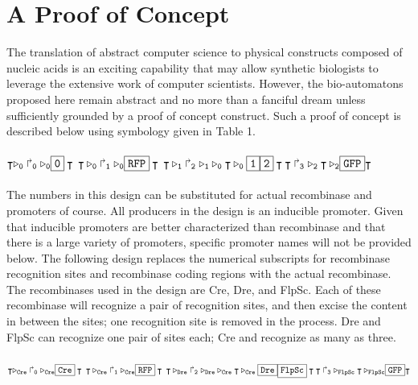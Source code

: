 \documentclass{article}
\newcommand{\prom}[1]{\Rsh_{\tt#1}}
\newcommand{\term}{\intercal}
\newcommand{\rrecsite}[1]{\triangleright_{\tt#1}}
\newcommand{\gene}[1]{\framebox{\tt #1}}
\begin{document}
\section{A Proof of Concept}
The translation of abstract computer science to physical constructs composed of nucleic acids is an exciting capability that may allow synthetic biologists to leverage the extensive work of computer scientists.  However, the bio-automatons proposed here remain abstract and no more than a fanciful dream unless sufficiently grounded by a proof of concept construct.  Such a proof of concept is described below using symbology given in Table 1.\\
 \\
$\term \rrecsite{0} \prom{0} \rrecsite{0} \gene{0} \term\\ 
\term \rrecsite{0} \prom{1} \rrecsite{0} \gene{RFP} \term\\
\term \rrecsite{1} \prom{2} \rrecsite{1} \rrecsite{0} \term \rrecsite{0} \gene{1} \gene{2} \term\\
\term \prom{3} \rrecsite{2} \term \rrecsite{2} \gene{GFP} \term$\\
 \\
The numbers in this design can be substituted for actual recombinase and promoters of course.  All producers in the design is an inducible promoter.  Given that inducible promoters are better characterized than recombinase and that there is a large variety of promoters, specific promoter names will not be provided below.  The following design replaces the numerical subscripts for recombinase recognition sites and recombinase coding regions with the actual recombinase.  The recombinases used in the design are Cre, Dre, and FlpSc.  Each of these recombinase will recognize a pair of recognition sites, and then excise the content in between the sites; one recognition site is removed in the process. Dre and FlpSc can recognize one pair of sites each; Cre and recognize as many as three.
\\
 \\
$\term \rrecsite{Cre} \prom{0} \rrecsite{Cre} \gene{Cre} \term\\ 
\term \rrecsite{Cre} \prom{1} \rrecsite{Cre} \gene{RFP} \term\\
\term \rrecsite{Dre} \prom{2} \rrecsite{Dre} \rrecsite{Cre} \term \rrecsite{Cre} \gene{Dre} \gene{FlpSc} \term\\
\term \prom{3} \rrecsite{FlpSc} \term \rrecsite{FlpSc} \gene{GFP} \term$\\
\newpage%
\end{document}
